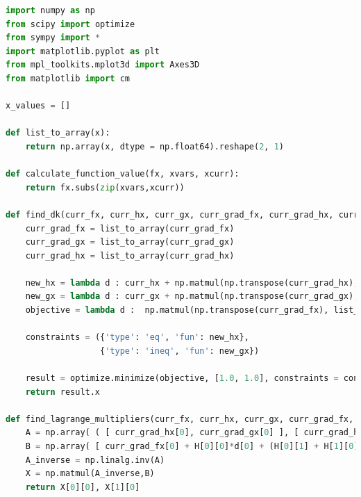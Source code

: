 \documentclass{article}
\begin{document}

\lstset{style=mystyle}

\begin{lstlisting}[language=Python, caption=main.py]
import numpy as np
from scipy import optimize
from sympy import *
import matplotlib.pyplot as plt
from mpl_toolkits.mplot3d import Axes3D
from matplotlib import cm

x_values = []

def list_to_array(x):
    return np.array(x, dtype = np.float64).reshape(2, 1)

def calculate_function_value(fx, xvars, xcurr):
    return fx.subs(zip(xvars,xcurr))

def find_dk(curr_fx, curr_hx, curr_gx, curr_grad_fx, curr_grad_hx, curr_grad_gx, H):
    curr_grad_fx = list_to_array(curr_grad_fx)
    curr_grad_gx = list_to_array(curr_grad_gx)
    curr_grad_hx = list_to_array(curr_grad_hx)

    new_hx = lambda d : curr_hx + np.matmul(np.transpose(curr_grad_hx), list_to_array(d))
    new_gx = lambda d : curr_gx + np.matmul(np.transpose(curr_grad_gx), list_to_array(d))
    objective = lambda d :  np.matmul(np.transpose(curr_grad_fx), list_to_array(d)) + (np.matmul(np.transpose(list_to_array(d)), np.matmul(H, list_to_array(d))))/2

    constraints = ({'type': 'eq', 'fun': new_hx},
                   {'type': 'ineq', 'fun': new_gx})

    result = optimize.minimize(objective, [1.0, 1.0], constraints = constraints)
    return result.x

def find_lagrange_multipliers(curr_fx, curr_hx, curr_gx, curr_grad_fx, curr_grad_hx, curr_grad_gx, H, d):
    A = np.array( ( [ curr_grad_hx[0], curr_grad_gx[0] ], [ curr_grad_hx[1], curr_grad_gx[1]] ), dtype = np.float64)
    B = np.array( [ curr_grad_fx[0] + H[0][0]*d[0] + (H[0][1] + H[1][0])*d[1] , curr_grad_fx[1] + H[1][1]*d[1] + (H[0][1] + H[1][0])*d[0] ], dtype = np.float64 ).reshape(2,1)
    A_inverse = np.linalg.inv(A)
    X = np.matmul(A_inverse,B)
    return X[0][0], X[1][0]


\end{lstlisting}
\end{document}
